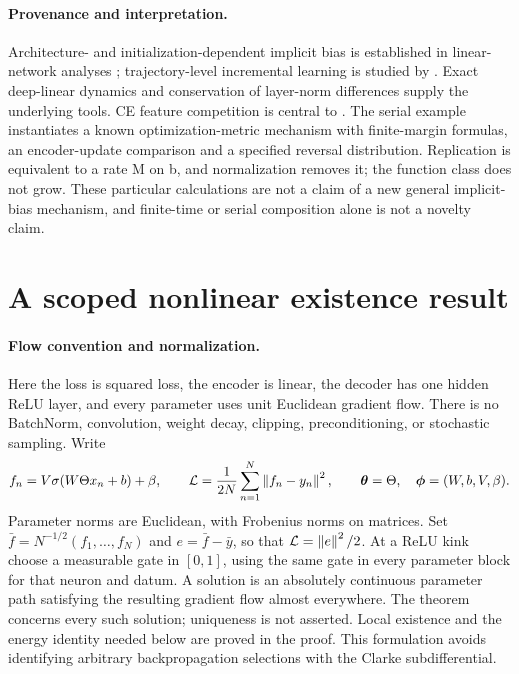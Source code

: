 \paragraph{Provenance and interpretation.}
Architecture- and initialization-dependent implicit bias is established
in linear-network analyses \citep{astra_yun2021,astra_moroshko2020};
trajectory-level incremental learning is studied by
\citet{astra_berthier2023}. Exact deep-linear dynamics
\citep{astra_saxe2014} and conservation of layer-norm differences
\citep{astra_du2018balance} supply the underlying tools. CE feature
competition is central to \citet{pezeshki2021gradient}.
The serial example instantiates a known optimization-metric mechanism
with finite-margin formulas, an encoder-update comparison and a specified
reversal distribution. Replication is equivalent to a rate M on b,
and normalization removes it; the function class does not grow.
These particular calculations are not a claim of a new general implicit-bias
mechanism, and finite-time or serial composition alone is not a novelty claim.

\section{A scoped nonlinear existence result}
\label{sec:astra_nonlinear}

\paragraph{Flow convention and normalization.}
Here the loss is squared loss, the encoder is linear, the decoder has
one hidden ReLU layer, and every parameter uses unit Euclidean gradient
flow. There is no BatchNorm, convolution, weight decay, clipping,
preconditioning, or stochastic sampling. Write
\[
 f_n=V\sigma(W\Theta x_n+b)+\beta,\qquad
 \mathcal{L}=\frac1{2N}\sum_{n=1}^N\left\lVert f_n-y_n\right\rVert^2,
 \qquad {\boldsymbol{\theta}}=\Theta,\quad{\boldsymbol{\phi}}=(W,b,V,\beta).
\]
Parameter norms are Euclidean, with Frobenius norms on matrices.
Set $\bar f=N^{-1/2}(f_1,\ldots,f_N)$ and
$e=\bar f-\bar y$, so that $\mathcal{L}=\left\lVert e\right\rVert^2/2$.
At a ReLU kink choose a measurable gate in $[0,1]$, using the same gate
in every parameter block for that neuron and datum. A solution is an
absolutely continuous parameter path satisfying the resulting gradient
flow almost everywhere. The theorem concerns every such solution;
uniqueness is not asserted. Local existence and the energy identity
needed below are proved in the proof. This formulation avoids identifying
arbitrary backpropagation selections with the Clarke subdifferential.

